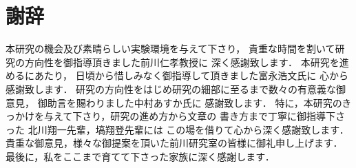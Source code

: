 \chapter*{謝辞}
\label{sec:thanks}

本研究の機会及び素晴らしい実験環境を与えて下さり，
貴重な時間を割いて研究の方向性を御指導頂きました前川仁孝教授に
深く感謝致します．
本研究を進めるにあたり，
日頃から惜しみなく御指導して頂きました富永浩文氏に
心から感謝致します．
研究の方向性をはじめ研究の細部に至るまで数々の有意義な御意見，
御助言を賜わりました中村あすか氏に
感謝致します．
特に，本研究のきっかけを与えて下さり，研究の進め方から文章の
書き方まで丁寧に御指導下さった
北川翔一先輩，塙翔登先輩には
この場を借りて心から深く感謝致します．
貴重な御意見，様々な御提案を頂いた前川研究室の皆様に御礼申し上げます．
最後に，私をここまで育てて下さった家族に深く感謝します．


\thanksend


%
%
%
%
%
%
%
